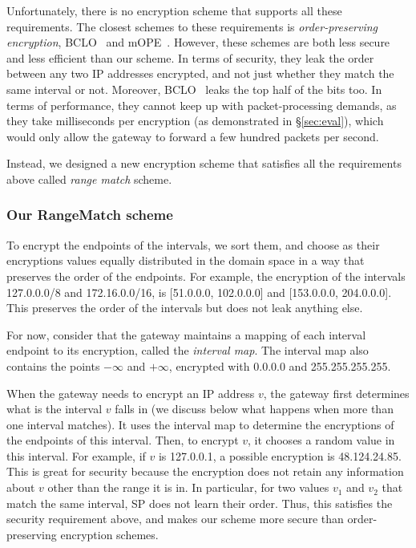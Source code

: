 Unfortunately, there is no encryption scheme that supports all these requirements. The closest schemes to these requirements  is {\em order-preserving encryption}, BCLO~\cite{boldyreva:ope} and mOPE~\cite{popa:mope}. However, these schemes are both less secure and less efficient than our scheme. In terms of security, they leak the order between any two IP addresses encrypted, and not just whether they match the same interval or not. Moreover, BCLO~\cite{boldyreva:ope} leaks the top half of the bits too. In terms of performance, they cannot keep up with packet-processing demands, as they take milliseconds per encryption (as demonstrated in \S\ref{sec:eval}), which would only allow the gateway to forward a few hundred packets per second. 


Instead, we designed a new encryption scheme that satisfies all the requirements above called {\em range match} scheme. 

\subsubsection{Our RangeMatch scheme} 




To encrypt the endpoints of the intervals, we sort them, and choose as their encryptions values equally distributed in the domain space in a way that preserves the order of the endpoints. For example, the encryption of the intervals 127.0.0.0/8 and 172.16.0.0/16, is [51.0.0.0, 102.0.0.0] and [153.0.0.0, 204.0.0.0]. This preserves the order of the intervals but does not leak anything else.

For now, consider that the gateway  maintains a mapping of each interval endpoint  to its encryption, called the {\em interval map}.  The interval map also contains the points $- \infty$ and $+ \infty$, encrypted with 0.0.0.0 and 255.255.255.255. 


When the gateway needs to encrypt an IP address $v$, the gateway first determines what  is the interval  $v$ falls in (we discuss below what happens when more than one interval matches). It uses the interval map to determine the encryptions of the endpoints of this interval. Then, to encrypt $v$, it chooses a random value in this interval.
For example, if $v$ is 127.0.0.1, a possible encryption is 48.124.24.85. This is great for security because the encryption does not retain any information about $v$ other than the range it is in. In particular, for two values $v_1$ and $v_2$ that match the same interval, SP does not learn their order. Thus, this satisfies the security requirement above, and makes our scheme more secure than order-preserving encryption schemes.


